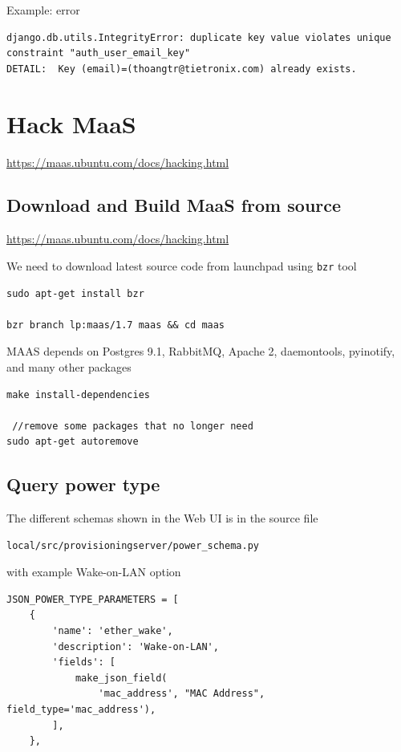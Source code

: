Example: error
\begin{verbatim}
django.db.utils.IntegrityError: duplicate key value violates unique constraint "auth_user_email_key"
DETAIL:  Key (email)=(thoangtr@tietronix.com) already exists.

\end{verbatim}

\section{Hack MaaS}

\url{https://maas.ubuntu.com/docs/hacking.html}

\subsection{Download and Build MaaS from source}

\url{https://maas.ubuntu.com/docs/hacking.html}

We need to download latest source code from launchpad using \verb!bzr! tool
\begin{verbatim}
sudo apt-get install bzr

bzr branch lp:maas/1.7 maas && cd maas
\end{verbatim}

MAAS depends on Postgres 9.1, RabbitMQ, Apache 2, daemontools, pyinotify, and
many other packages
\begin{verbatim}
make install-dependencies

 //remove some packages that no longer need
sudo apt-get autoremove
\end{verbatim}

\subsection{Query power type}
\label{sec:query_powertype}

The different schemas shown in the Web UI is in the source file
\begin{verbatim}
local/src/provisioningserver/power_schema.py
\end{verbatim}
with example Wake-on-LAN option
\begin{verbatim}
JSON_POWER_TYPE_PARAMETERS = [
    {
        'name': 'ether_wake',
        'description': 'Wake-on-LAN',
        'fields': [
            make_json_field(
                'mac_address', "MAC Address", field_type='mac_address'),
        ],
    },

\end{verbatim}

